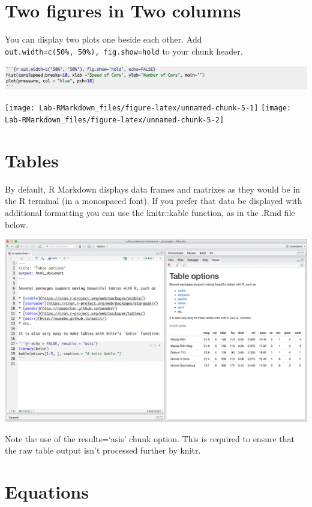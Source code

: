 \documentclass[]{article}
\begin{document}
\hypertarget{two-figures-in-two-columns}{%
\section{Two figures in Two columns}\label{two-figures-in-two-columns}}

You can display two plots one beside each other. Add
\texttt{out.width=c(\textquotesingle{}50\%\textquotesingle{},\ \textquotesingle{}50\%\textquotesingle{}),\ fig.show=\textquotesingle{}hold\textquotesingle{}}
to your chunk header.

\includegraphics{picture5.png}

\texttt{[image: Lab-RMarkdown\_files/figure-latex/unnamed-chunk-5-1]}
\texttt{[image: Lab-RMarkdown\_files/figure-latex/unnamed-chunk-5-2]}

\hypertarget{tables}{%
\section{Tables}\label{tables}}

By default, R Markdown displays data frames and matrixes as they would
be in the R terminal (in a monospaced font). If you prefer that data be
displayed with additional formatting you can use the knitr::kable
function, as in the .Rmd file below.

\includegraphics{tables-1-kable.png}

Note the use of the results=`asis' chunk option. This is required to
ensure that the raw table output isn't processed further by knitr.

\hypertarget{equations}{%
\section{Equations}\label{equations}}
\end{document}
